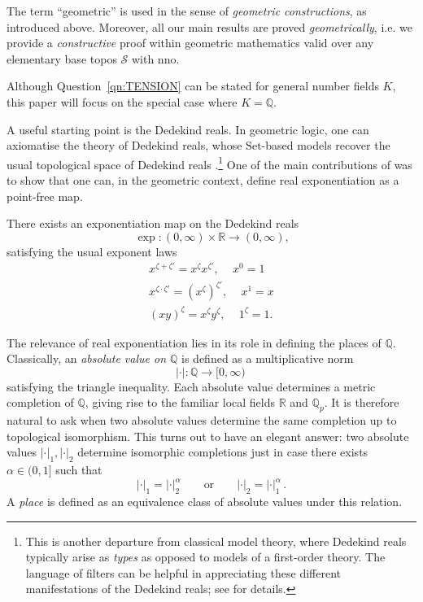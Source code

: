 \documentclass[a4paper, 11pt,reqno]{amsart}
\newcommand{\Set}{\mathrm{Set}}
\newcommand{\R}{\mathbb{R}}
\newcommand{\baseS}{\mathcal{S}}
\newcommand{\Q}{\mathbb{Q}}
\begin{document}
\begin{convention}\label{conv:geometricity} The term ``geometric'' is used in the sense of {\em geometric constructions}, as introduced above. Moreover, all our main results are proved {\em geometrically}, i.e. we provide a {\em constructive} proof within geometric mathematics valid over any elementary base topos $\baseS$ with nno. 	
\end{convention}

\begin{convention} Although Question~\ref{qn:TENSION} can be stated for general number fields $K$, this paper will focus on the special case where $K=\Q$.
\end{convention}

A useful starting point is the Dedekind reals. In geometric logic, one can axiomatise the theory of Dedekind reals, whose $\Set$-based models recover the usual topological space of Dedekind reals \cite{Vi3}.\footnote{This is another departure from classical model theory, where Dedekind reals typically arise as {\em types} as opposed to models of a first-order theory. The language of filters can be helpful in appreciating these different manifestations of the Dedekind reals; see \cite[\S 1.1]{NgBerk} for details.} One of the main contributions of \cite{NV} was to show that one can, in the geometric context, define real exponentiation as a point-free map.

\begin{maintheorem}[{{\cite{NV}}}]\label{thm:xzetaDed} There exists an exponentiation map on the Dedekind reals
$$	\exp\colon (0,\infty)\times \R \to (0,\infty)
\text{,}$$
	satisfying the usual exponent laws
	\begin{gather}
	x^{\zeta+\zeta'}=x^\zeta x^{\zeta'}\text{, }
	\quad x^0=1
	\nonumber 
	\\
	x^{\zeta\cdot \zeta'}=(x^\zeta)^{\zeta'}\text{, }
	\quad x^1 = x \nonumber 
	\\
	(xy)^\zeta = x^\zeta y^\zeta\text{, }
	\quad 1^\zeta = 1. \nonumber
	\end{gather}
\end{maintheorem}

The relevance of real exponentiation lies in its role in defining the places of $\Q$. Classically, an {\em absolute value on $\Q$} is defined as a multiplicative norm
$$|\cdot|\colon \Q\to [0,\infty)\,$$
satisfying the triangle inequality. Each absolute value determines a metric completion of $\Q$, giving rise to the familiar local fields $\R$ and $\Q_p$. It is therefore natural to ask when two absolute values determine the same completion up to topological isomorphism. This turns out to have an elegant answer: two absolute values $|\cdot|_1,|\cdot|_2$ determine isomorphic completions just in case there exists $\alpha\in(0,1]$ such that $$|\cdot|_1=|\cdot|_2^\alpha \qquad\text{or}\qquad |\cdot|_2=|\cdot|_1^\alpha\,.$$
A {\em place} is defined as an equivalence class of absolute values under this relation. 
\end{document}
